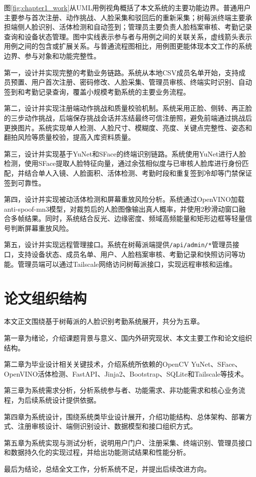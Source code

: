 图\ref{fig:chapter1_work}从UML用例视角概括了本文系统的主要功能边界。普通用户主要参与首次注册、动作挑战、人脸采集和驳回后的重新采集；树莓派终端主要承担端侧人脸识别、活体检测和自动签到；管理员主要负责人脸档案审核、考勤记录查询和设备状态管理。图中实线表示参与者与用例之间的关联关系，虚线箭头表示用例之间的包含或扩展关系。与普通流程图相比，用例图更能体现本文工作的系统边界、参与对象和功能完整性。

第一，设计并实现完整的考勤业务链路。系统从本地CSV成员名单开始，支持成员预置、用户首次注册、密码修改、人脸采集、管理员审核、终端实时识别、自动签到和考勤记录查询，覆盖小规模考勤系统的主要业务流程。

第二，设计并实现注册端动作挑战和质量校验机制。系统采用正脸、侧转、再正脸的三步动作挑战，后端保存挑战会话并冻结最终可信注册照，避免前端通过挑战后更换图片。系统实现单人检测、人脸尺寸、模糊度、亮度、关键点完整性、姿态和翻拍风险等质量校验，提高入库资料质量。

第三，设计并实现基于YuNet和SFace的终端识别链路。系统使用YuNet进行人脸检测，使用SFace提取人脸特征向量，通过余弦相似度与已审核人脸库进行身份匹配，并结合单人入镜、人脸面积、活体检测、考勤时段和重复签到冷却等门禁保证签到可靠性。

第四，设计并实现被动活体检测和屏幕重放风险分析。系统通过OpenVINO加载anti-spoof-mn3模型，对裁剪后的人脸图像输出真人概率，并使用2秒滑动窗口融合多帧结果。同时，系统结合反光、边缘密度、频域高频能量和矩形边框等轻量信号判断屏幕重放风险。

第五，设计并实现远程管理接口。系统在树莓派端提供\texttt{/api/admin/*}管理员接口，支持设备状态、成员名单、用户、人脸档案审核、考勤记录和快照访问等功能。管理员端可以通过Tailscale网络访问树莓派接口，实现远程审核和运维。

\section{论文组织结构}

本文正文围绕基于树莓派的人脸识别考勤系统展开，共分为五章。

第一章为绪论，介绍课题背景与意义、国内外研究现状、本文主要工作和论文组织结构。

第二章为毕业设计相关关键技术，介绍系统所依赖的OpenCV YuNet、SFace、OpenVINO活体检测、FastAPI、Jinja2、Bootstrap、SQLite和Tailscale等技术。

第三章为系统需求分析，分析系统参与者、功能需求、非功能需求和核心业务流程，为后续系统设计提供依据。

第四章为系统设计，围绕系统类毕业设计展开，介绍功能结构、总体架构、部署方式、注册审核设计、端侧识别设计、数据模型和接口组织方式。

第五章为系统实现与测试分析，说明用户门户、注册采集、终端识别、管理员接口和数据持久化的实现过程，并给出功能测试结果和性能分析。

最后为结论，总结全文工作，分析系统不足，并提出后续改进方向。

